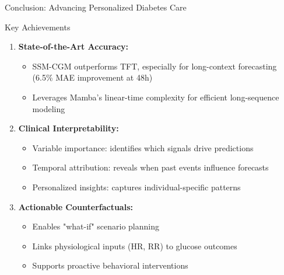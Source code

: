 \documentclass[aspectratio=169,xcolor=dvipsnames]{beamer}
\begin{document}
\begin{frame}{Conclusion: Advancing Personalized Diabetes Care}
    \begin{block}{Key Achievements}
        \begin{enumerate}
            \item \textbf{State-of-the-Art Accuracy:}
            \begin{itemize}
                \item SSM-CGM outperforms TFT, especially for long-context forecasting (6.5\% MAE improvement at 48h)
                \item Leverages Mamba's linear-time complexity for efficient long-sequence modeling
            \end{itemize}
            
            \item \textbf{Clinical Interpretability:}
            \begin{itemize}
                \item Variable importance: identifies which signals drive predictions
                \item Temporal attribution: reveals when past events influence forecasts
                \item Personalized insights: captures individual-specific patterns
            \end{itemize}
            
            \item \textbf{Actionable Counterfactuals:}
            \begin{itemize}
                \item Enables "what-if" scenario planning
                \item Links physiological inputs (HR, RR) to glucose outcomes
                \item Supports proactive behavioral interventions
            \end{itemize}
        \end{enumerate}
    \end{block}
\end{frame}
\end{document}
